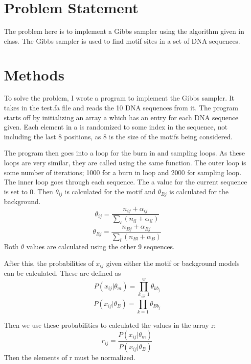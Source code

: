\documentclass{acm_proc_article-sp}
\begin{document}
\section{Problem Statement}
The problem here is to implement a Gibbs sampler using the algorithm given in class.  The Gibbs sampler is used to find motif sites in a set of DNA sequences.  


\section{Methods}
To solve the problem, I wrote a program to implement the Gibbs sampler.  It takes in the test.fa file and reads the 10 DNA sequences from it.  The program starts off by initializing an array a which has an entry for each DNA sequence given.  Each element in a is randomized to some index in the sequence, not including the last 8 positions, as 8 is the size of the motifs being considered.  

The program then goes into a loop for the burn in and sampling loops.  As these loops are very similar, they are called using the same function.  The outer loop is some number of iterations; 1000 for a burn in loop and 2000 for sampling loop.  The inner loop goes through each sequence.  The a value for the current sequence is set to 0.  Then $\theta_{ij}$ is calculated for the motif and $\theta_{Bj}$ is calculated for the background.  \begin{equation}\theta_{ij} = \frac {n_{ij} +\alpha_{ij}}{\sum_{l}(n_{il}+\alpha_{il})}\end{equation}
\begin{equation}\theta_{Bj} = \frac {n_{Bj} +\alpha_{Bj}}{\sum_{l}(n_{Bl}+\alpha_{B})}\end{equation}
Both $\theta$ values are calculated using the other 9 sequences.

After this, the probabilities of $x_{ij}$ given either the motif or background models can be calculated.  These are defined as
\begin{equation}P(x_{ij} | \theta_{m}) = \prod\limits_{k=1}^{w}\theta_{kb_{j}} \end{equation}
\begin{equation}P(x_{ij} | \theta_{B}) = \prod\limits_{k=1}^{w}\theta_{Bb_{j}} \end{equation}

Then we use these probabilities to calculated the values in the array r:
\begin{equation} r_{ij} = \frac{P(x_{ij} | \theta_{m})}{P(x_{ij} | \theta_{B})} \end{equation}
Then the elements of r must be normalized.
\end{document}
